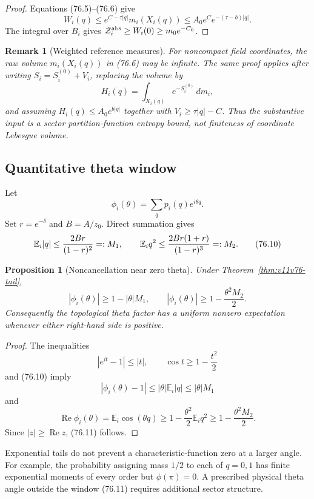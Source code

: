 \documentclass[11pt]{article}
\newtheorem{proposition}[theorem]{Proposition}
\newtheorem{remark}[theorem]{Remark}
\begin{document}
\begin{proof}
Equations (76.5)--(76.6) give
\[
 W_i(q)\le e^{C-\tau|q|}m_i(X_i(q))
          \le A_0e^C e^{-(\tau-b)|q|}.
\]
The integral over \(B_i\) gives
\({\cal Z}_i^{\rm abs}\ge W_i(0)\ge m_0e^{-C_0}\).
\end{proof}

\begin{remark}[Weighted reference measures]
\label{rem:v11v76-reference}
For noncompact field coordinates, the raw volume
\(m_i(X_i(q))\) in (76.6) may be infinite.  The same proof applies
after writing \(S_i=S_i^{(0)}+V_i\), replacing the volume by
\[
 H_i(q)=\int_{X_i(q)}e^{-S_i^{(0)}}\,dm_i,
\]
and assuming \(H_i(q)\le A_0e^{b|q|}\) together with
\(V_i\ge\tau|q|-C\).  Thus the substantive input is a sector
partition-function entropy bound, not finiteness of coordinate
Lebesgue volume.
\end{remark}

\subsection{Quantitative theta window}

Let
\[
                         \phi_i(\theta)
           =\sum_qp_i(q)e^{i\theta q}.                        \tag{76.9}
\]
Set \(r=e^{-\delta}\) and \(B=A/z_0\).  Direct summation gives
\[
 \mathbb E_i|q|
 \le {2Br\over(1-r)^2}=:M_1,\qquad
 \mathbb E_iq^2
 \le {2Br(1+r)\over(1-r)^3}=:M_2.                            \tag{76.10}
\]

\begin{proposition}[Noncancellation near zero theta]
\label{prop:v11v76-theta}
Under Theorem~\ref{thm:v11v76-tail},
\[
 |\phi_i(\theta)|
 \ge 1-|\theta|M_1,\qquad
 |\phi_i(\theta)|
 \ge 1-\frac{\theta^2M_2}{2}.                                \tag{76.11}
\]
Consequently the topological theta factor has a uniform nonzero
expectation whenever either right-hand side is positive.
\end{proposition}

\begin{proof}
The inequalities
\[
 |e^{it}-1|\le |t|,\qquad
 \cos t\ge1-\frac{t^2}{2}
\]
and (76.10) imply
\[
 |\phi_i(\theta)-1|
 \le|\theta|\mathbb E_i|q|\le|\theta|M_1
\]
and
\[
 \operatorname{Re}\phi_i(\theta)
 =\mathbb E_i\cos(\theta q)
 \ge1-\frac{\theta^2}{2}\mathbb E_iq^2
 \ge1-\frac{\theta^2M_2}{2}.
\]
Since \(|z|\ge\operatorname{Re}z\), (76.11) follows.
\end{proof}

\begin{warning}
\label{warn:v11v76-large-theta}
Exponential tails do not prevent a characteristic-function zero at a
larger angle.  For example, the probability assigning mass \(1/2\)
to each of \(q=0,1\) has finite exponential moments of every order but
\(\phi(\pi)=0\).  A prescribed physical theta angle outside the
window (76.11) requires additional sector structure.
\end{warning}
\end{document}
